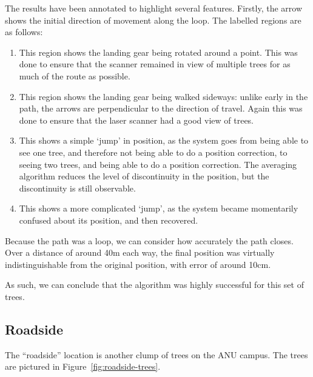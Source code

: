 \documentclass[12pt,oneside,a4paper]{book}
\begin{document}
The results have been annotated to highlight several
features. Firstly, the arrow shows the initial direction of movement
along the loop. The labelled regions are as follows:
\begin{enumerate}[A:]
\item This region shows the landing gear being rotated around a
  point. This was done to ensure that the scanner remained in view of
  multiple trees for as much of the route as possible.
\item This region shows the landing gear being walked sideways: unlike
  early in the path, the arrows are perpendicular to the direction of
  travel. Again this was done to ensure that the laser scanner had a
  good view of trees.
\item This shows a simple `jump' in position, as the system goes from
  being able to see one tree, and therefore not being able to do a
  position correction, to seeing two trees, and being able to do a
  position correction. The averaging algorithm reduces the level of
  discontinuity in the position, but the discontinuity is still
  observable.
\item This shows a more complicated `jump', as the system became
  momentarily confused about its position, and then recovered.
\end{enumerate}

Because the path was a loop, we can consider how accurately the path
closes. Over a distance of around 40m each way, the final position was
virtually indistinguishable from the original position, with error of
around 10cm.

As such, we can conclude that the algorithm was highly successful for
this set of trees.

\subsection{Roadside}
\label{sec:roadside}

The ``roadside'' location is another clump of trees on the ANU
campus. The trees are pictured in Figure~\ref{fig:roadside-trees}.
\end{document}
